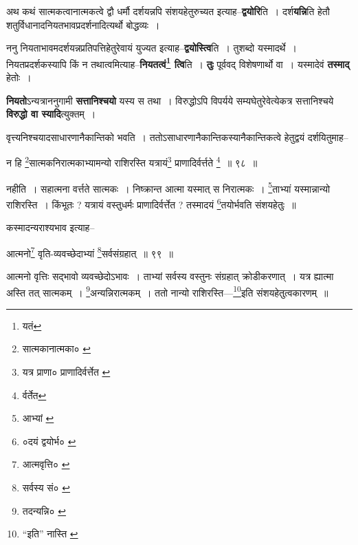 \documentclass[article,12pt,a4paper]{memoir}
\begin{document}
	  \pstart अथ कथं सात्मकत्वानात्मकत्वे द्वौ धर्मौ दर्शयन्नपि संशयहेतुरुच्यत इत्याह--\textbf{द्वयोरि}ति । दर्श\leavevmode{}\textbf{यन्नि}ति हेतौ शतुर्विधानादनियतभावप्रदर्शनादित्यर्थो बोद्धव्यः ।
	\pend
      

	  \pstart ननु नियताभावमदर्शयन्नप्रतिपत्तिहेतुरेवायं युज्यत इत्याह--\textbf{द्वयोस्त्वि}ति । तुशब्दो यस्मादर्थे । नियतप्रदर्शकस्यापि किं न तथात्वमित्याह--\textbf{नियतत्वं\footnote{यतं} त्वि}ति । \textbf{तुः} पूर्ववद् विशेषणार्थो वा । यस्मादेवं \textbf{तस्माद्} हेतोः ।
	\pend
      

	  \pstart \textbf{नियतो}ऽन्यत्राननुगामी \textbf{सत्तानिश्चयो} यस्य स तथा । विरुद्धोऽपि विपर्यये सम्यघेतुरेवेत्येकत्र सत्तानिश्चये \textbf{विरुद्धो वा स्यादि}त्युक्तम् ।
	\pend
	  \bigskip
	  \begingroup
	

	  \pstart वृत्त्यनिश्चयादसाधारणानैकान्तिको भवति । ततोऽसाधारणानैकान्तिकस्यानैकान्तिकत्वे हेतुद्वयं दर्शयितुमाह--
	\pend
       
	  \bigskip
	  \begingroup
	

	  \pstart न हि \footnote{सात्मकानात्मका० \cite{dp-msC}}\-सात्मकनिरात्मकाभ्यामन्यो राशिरस्ति यत्रायं\footnote{यत्र प्राणा० \cite{dp-msD} \cite{dp-msB} \cite{dp-edP} \cite{dp-edH} \cite{dp-edE} \cite{dp-edN} प्राणादिर्वर्त्तेत \cite{dp-edN}} प्राणादिर्वर्त्तते \footnote{र्वर्तेत} ॥ ९८ ॥
	\pend
      
	  \endgroup
	 

	  \pstart नहीति । सहात्मना वर्त्तते सात्मकः । निष्क्रान्त आत्मा यस्मात् स निरात्मकः । \footnote{आभ्यां \cite{dp-msD}}\-ताभ्यां यस्मान्नान्यो राशिरस्ति । किंभूतः ? यत्रायं वस्तुधर्मः प्राणादिर्वर्त्तेत ? तस्मादयं \footnote{०दयं द्वयोर्भ० \cite{dp-msC}}\-तयोर्भवति संशयहेतुः ॥
	\pend
       

	  \pstart कस्मादन्यराश्यभाव इत्याह--
	\pend
       
	  \bigskip
	  \begingroup
	

	  \pstart आत्मनो\footnote{आत्मवृत्ति० \cite{dp-msC}} वृति-व्यवच्छेदाभ्यां \footnote{सर्वस्य सं० \cite{dp-msC}}\-सर्वसंग्रहात् ॥ ९९ ॥
	\pend
      
	  \endgroup
	 

	  \pstart आत्मनो वृत्तिः सद्भावो व्यवच्छेदोऽभावः । ताभ्यां सर्वस्य वस्तुनः संग्रहात् क्रोडीकरणात् । यत्र ह्यात्मा अस्ति तत् सात्मकम् । \footnote{तदन्यन्नि० \cite{dp-msA} \cite{dp-msB} \cite{dp-edP} \cite{dp-edH} \cite{dp-edN}}\-अन्यन्निरात्मकम् । ततो नान्यो राशिरस्ति—\footnote{“इति” नास्ति \cite{dp-msA} \cite{dp-msB} \cite{dp-msC} \cite{dp-msD} \cite{dp-edP} \cite{dp-edH} \cite{dp-edN}}\-इति संशयहेतुत्वकारणम् ॥
	\pend
      
\end{document}

